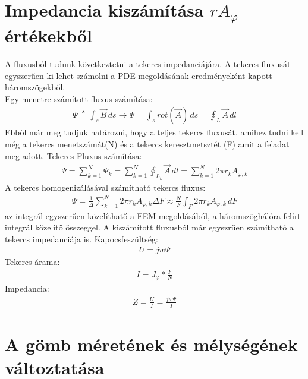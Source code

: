 \section{Impedancia kiszámítása $rA_{\varphi}$ értékekből}
%
A fluxusból tudunk következtetni a tekercs impedanciájára. A tekercs fluxusát
egyszerűen ki lehet számolni a PDE megoldásának eredményeként kapott háromszögekből.\\
%
Egy menetre számított fluxus számítása:
%
\begin{align}
    \Psi \triangleq \int_{s}^{}  \vec{B} \,ds
    \rightarrow  \Psi = \int_{s} rot(\vec{A}) \,ds
    = \oint_L \vec{A} \,dl
\end{align}
%
Ebből már meg tudjuk határozni, hogy a teljes tekercs fluxusát, amihez tudni kell még a
tekercs menetszámát(N) és a tekercs keresztmetsztét (F) amit a feladat meg adott.
%
Tekercs Fluxus számítása:
\begin{align}
    \Psi = \sum_{k = 1}^{N}  \Psi_k = \sum_{k = 1}^{N} \oint_{L_k} \vec{A} \,dl
    = \sum_{k = 1}^{N} 2 \pi r_k A_{\varphi,k}
\end{align}
%
A tekercs homogenizálásával számítható tekercs fluxus:
\begin{align}
    \Psi = \frac{1}{\Delta} \sum_{k=1}^N  2 \pi r_k A_{\varphi,k} \Delta F \approx
    \frac{N}{F} \int_{F} 2 \pi r_k A_{\varphi,k} \,dF
\end{align}
%
az integrál egyszerűen közelíthatő a FEM megoldásából, a háromszöghálóra felírt
integrál közelítő összeggel.
%
A kiszámított fluxusból már egyszrűen számítható a tekercs impedanciája is.
%
Kapocsfeszültség:
\begin{align}
    U = jw\Psi
\end{align}
Tekercs árama:
\begin{align}
    I = J_{\varphi} * \frac{F}{N}
\end{align}
Impedancia:
\begin{align}
    Z = \frac{U}{I} = \frac{jw\Psi}{I}
\end{align}
%
\section{A gömb méretének és mélységének változtatása}
%
